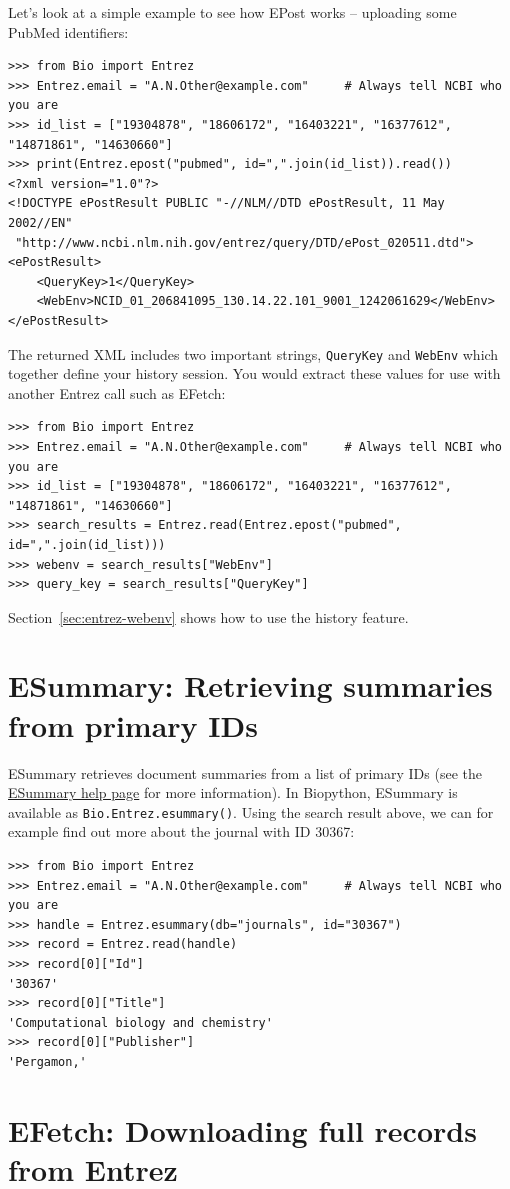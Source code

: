 \documentclass{report}
\begin{document}
Let's look at a simple example to see how EPost works -- uploading some PubMed identifiers:
\begin{verbatim}
>>> from Bio import Entrez
>>> Entrez.email = "A.N.Other@example.com"     # Always tell NCBI who you are
>>> id_list = ["19304878", "18606172", "16403221", "16377612", "14871861", "14630660"]
>>> print(Entrez.epost("pubmed", id=",".join(id_list)).read())
<?xml version="1.0"?>
<!DOCTYPE ePostResult PUBLIC "-//NLM//DTD ePostResult, 11 May 2002//EN"
 "http://www.ncbi.nlm.nih.gov/entrez/query/DTD/ePost_020511.dtd">
<ePostResult>
	<QueryKey>1</QueryKey>
	<WebEnv>NCID_01_206841095_130.14.22.101_9001_1242061629</WebEnv>
</ePostResult>
\end{verbatim}
\noindent The returned XML includes two important strings, \verb|QueryKey| and \verb|WebEnv| which together define your history session.
You would extract these values for use with another Entrez call such as EFetch:
\begin{verbatim}
>>> from Bio import Entrez
>>> Entrez.email = "A.N.Other@example.com"     # Always tell NCBI who you are
>>> id_list = ["19304878", "18606172", "16403221", "16377612", "14871861", "14630660"]
>>> search_results = Entrez.read(Entrez.epost("pubmed", id=",".join(id_list)))
>>> webenv = search_results["WebEnv"]
>>> query_key = search_results["QueryKey"] 
\end{verbatim}
\noindent Section~\ref{sec:entrez-webenv} shows how to use the history feature.

\section{ESummary: Retrieving summaries from primary IDs}
ESummary retrieves document summaries from a list of primary IDs (see the  \href{http://www.ncbi.nlm.nih.gov/entrez/query/static/esummary\_help.html}{ESummary help page} for more information). In Biopython, ESummary is available as \verb+Bio.Entrez.esummary()+. Using the search result above, we can for example find out more about the journal with ID 30367:
\begin{verbatim}
>>> from Bio import Entrez
>>> Entrez.email = "A.N.Other@example.com"     # Always tell NCBI who you are
>>> handle = Entrez.esummary(db="journals", id="30367")
>>> record = Entrez.read(handle)
>>> record[0]["Id"]
'30367'
>>> record[0]["Title"]
'Computational biology and chemistry'
>>> record[0]["Publisher"]
'Pergamon,'
\end{verbatim}

\section{EFetch: Downloading full records from Entrez}
\label{sec:efetch}
\end{document}
